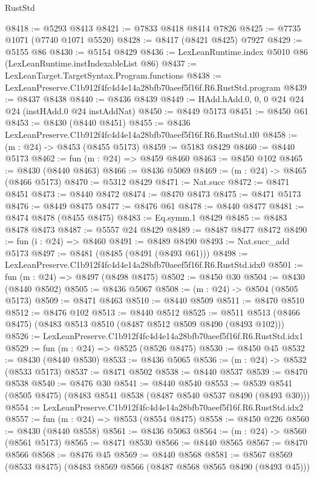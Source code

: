 \begin{lexlean}{RustStd}
\begin{coremodule}
@8418 := @5293 @8413
@8421 := @7833 @8418 @8414 @7826
@8425 := @7735 @1071 (@7740 @1071 @5520)
@8428 := @8417 (@8421 @8425) @7927
@8429 := @5155 @86
@8430 := @5154 @8429
@8436 := LexLeanRuntime.index @5010 @86 (LexLeanRuntime.instIndexableList @86)
@8437 := LexLeanTarget.TargetSyntax.Program.functions
@8438 := LexLeanPreserve.C1b912f4fc4d4e14a28bfb70aeef5f16f.R6.RustStd.program
@8439 := @8437 @8438
@8440 := @8436 @8439
@8449 := HAdd.hAdd.{0, 0, 0} @24 @24 @24 (instHAdd.{0} @24 instAddNat)
@8450 := @8449 @5173
@8451 := @8450 @61
@8453 := @8430 (@8440 @8451)
@8455 := @8436 LexLeanPreserve.C1b912f4fc4d4e14a28bfb70aeef5f16f.R6.RustStd.tl0
@8458 := (m : @24) -> @8453 (@8455 @5173)
@8459 := @5183 @8429
@8460 := @8440 @5173
@8462 := fun (m : @24) => @8459 @8460
@8463 := @8450 @102
@8465 := @8430 (@8440 @8463)
@8466 := @8436 @5069
@8469 := (m : @24) -> @8465 (@8466 @5173)
@8470 := @5312 @8429
@8471 := Nat.succ
@8472 := @8471 @8451
@8473 := @8440 @8472
@8474 := @8470 @8473
@8475 := @8471 @5173
@8476 := @8449 @8475
@8477 := @8476 @61
@8478 := @8440 @8477
@8481 := @8474 @8478 (@8455 @8475)
@8483 := Eq.symm.{1} @8429
@8485 := @8483 @8478 @8473
@8487 := @5557 @24 @8429
@8489 := @8487 @8477 @8472
@8490 := fun (i : @24) => @8460
@8491 := @8489 @8490
@8493 := Nat.succ_add @5173
@8497 := @8481 (@8485 (@8491 (@8493 @61)))
@8498 := LexLeanPreserve.C1b912f4fc4d4e14a28bfb70aeef5f16f.R6.RustStd.idx0
@8501 := fun (m : @24) => @8497 (@8498 @8475)
@8502 := @8450 @30
@8504 := @8430 (@8440 @8502)
@8505 := @8436 @5067
@8508 := (m : @24) -> @8504 (@8505 @5173)
@8509 := @8471 @8463
@8510 := @8440 @8509
@8511 := @8470 @8510
@8512 := @8476 @102
@8513 := @8440 @8512
@8525 := @8511 @8513 (@8466 @8475) (@8483 @8513 @8510 (@8487 @8512 @8509 @8490 (@8493 @102)))
@8526 := LexLeanPreserve.C1b912f4fc4d4e14a28bfb70aeef5f16f.R6.RustStd.idx1
@8529 := fun (m : @24) => @8525 (@8526 @8475)
@8530 := @8450 @45
@8532 := @8430 (@8440 @8530)
@8533 := @8436 @5065
@8536 := (m : @24) -> @8532 (@8533 @5173)
@8537 := @8471 @8502
@8538 := @8440 @8537
@8539 := @8470 @8538
@8540 := @8476 @30
@8541 := @8440 @8540
@8553 := @8539 @8541 (@8505 @8475) (@8483 @8541 @8538 (@8487 @8540 @8537 @8490 (@8493 @30)))
@8554 := LexLeanPreserve.C1b912f4fc4d4e14a28bfb70aeef5f16f.R6.RustStd.idx2
@8557 := fun (m : @24) => @8553 (@8554 @8475)
@8558 := @8450 @226
@8560 := @8430 (@8440 @8558)
@8561 := @8436 @5063
@8564 := (m : @24) -> @8560 (@8561 @5173)
@8565 := @8471 @8530
@8566 := @8440 @8565
@8567 := @8470 @8566
@8568 := @8476 @45
@8569 := @8440 @8568
@8581 := @8567 @8569 (@8533 @8475) (@8483 @8569 @8566 (@8487 @8568 @8565 @8490 (@8493 @45)))

\end{coremodule}
\end{lexlean}
